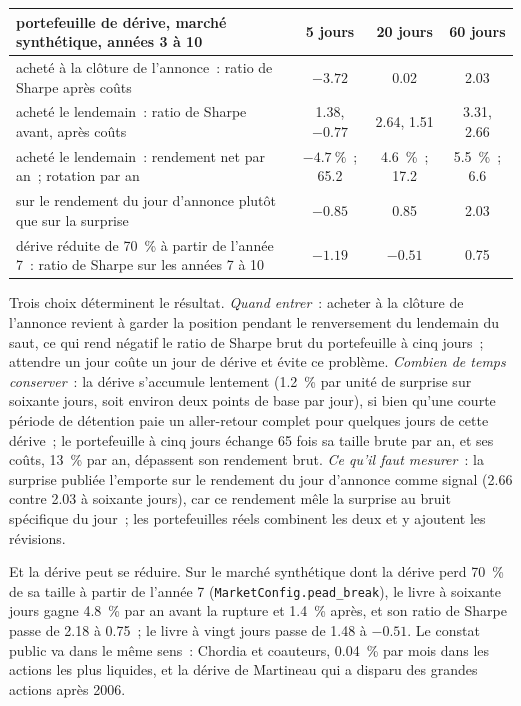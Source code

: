 \begin{center}
\small
\begin{tabular}{@{}p{8.4cm}ccc@{}}
\toprule
portefeuille de dérive, marché synthétique, années 3 à 10 & 5 jours & 20 jours & 60 jours\\
\midrule
acheté à la clôture de l'annonce~: ratio de Sharpe après coûts & $-3.72$ & 0.02 & 2.03\\
acheté le lendemain~: ratio de Sharpe avant, après coûts & 1.38, $-0.77$ & 2.64, 1.51 & 3.31, 2.66\\
acheté le lendemain~: rendement net par an~; rotation par an & $-4.7~\%$~; 65.2 & 4.6~\%~; 17.2 & 5.5~\%~; 6.6\\
sur le rendement du jour d'annonce plutôt que sur la surprise & $-0.85$ & 0.85 & 2.03\\
dérive réduite de 70~\% à partir de l'année 7~: ratio de Sharpe sur les années 7 à 10 & $-1.19$ & $-0.51$ & 0.75\\
\bottomrule
\end{tabular}
\end{center}

Trois choix déterminent le résultat. \emph{Quand entrer}~: acheter à la clôture de l'annonce revient à garder la position pendant le renversement du lendemain du saut, ce qui
rend négatif le ratio de Sharpe brut du portefeuille à cinq jours~; attendre un jour coûte un jour de dérive et évite ce problème. \emph{Combien de temps conserver}~: la dérive s'accumule lentement
(1.2~\% par unité de surprise sur soixante jours, soit environ deux points de base par jour), si bien qu'une courte période de détention paie un aller-retour complet pour quelques jours de cette dérive~; le
portefeuille à cinq jours échange 65 fois sa taille brute par an, et ses coûts, 13~\% par an, dépassent son rendement brut. \emph{Ce qu'il faut mesurer}~: la surprise publiée l'emporte sur le
rendement du jour d'annonce comme signal (2.66 contre 2.03 à soixante jours), car ce rendement mêle la surprise au bruit spécifique du jour~; les portefeuilles réels
combinent les deux et y ajoutent les révisions.

Et la dérive peut se réduire. Sur le marché synthétique dont la dérive perd 70~\% de sa taille à partir de l'année 7 (\texttt{MarketConfig.pead\_break}), le livre à soixante jours
gagne 4.8~\% par an avant la rupture et 1.4~\% après, et son ratio de Sharpe passe de 2.18 à 0.75~; le livre à vingt jours passe de 1.48 à $-0.51$. Le
constat public va dans le même sens~: Chordia et coauteurs, 0.04~\% par mois dans les actions les plus liquides, et la dérive de Martineau qui a disparu des grandes actions après
2006.

